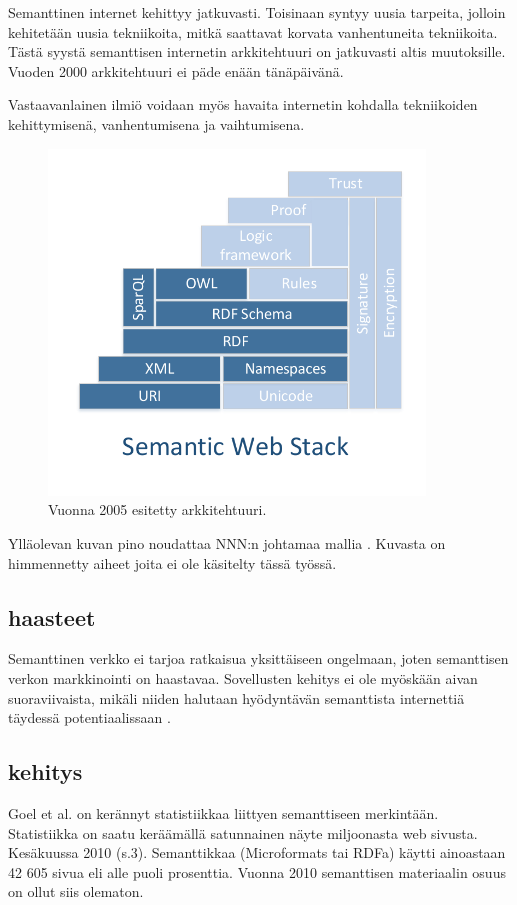 \documentclass[finnish, 12pt, a4paper, elec, utf8, pdfa, online]{aaltothesis}
\begin{document}
Semanttinen internet kehittyy jatkuvasti. Toisinaan syntyy uusia tarpeita, jolloin kehitetään uusia tekniikoita, mitkä saattavat korvata vanhentuneita tekniikoita. Tästä syystä semanttisen internetin arkkitehtuuri on jatkuvasti altis muutoksille. Vuoden 2000 arkkitehtuuri ei päde enään tänäpäivänä.

Vastaavanlainen ilmiö voidaan myös havaita internetin kohdalla tekniikoiden kehittymisenä, vanhentumisena ja vaihtumisena.

\begin{figure}[htb]
\centering
\includegraphics[width=10cm]{images/sweb-stack2.pdf}
\caption{Vuonna 2005 esitetty arkkitehtuuri. \label{images/sweb-stack2.pdf}}
\end{figure}


Ylläolevan kuvan pino noudattaa NNN:n johtamaa mallia \cite{stack}. Kuvasta on himmennetty aiheet joita ei ole käsitelty tässä työssä.
\clearpage %

\subsection{haasteet}
Semanttinen verkko ei tarjoa ratkaisua yksittäiseen ongelmaan, joten semanttisen verkon markkinointi on haastavaa. Sovellusten kehitys ei ole myöskään aivan suoraviivaista, mikäli niiden halutaan hyödyntävän semanttista internettiä täydessä potentiaalissaan \cite{lassila_dissertion}.

\subsection{kehitys}
Goel et al. on kerännyt statistiikkaa liittyen semanttiseen merkintään. Statistiikka on saatu keräämällä satunnainen näyte miljoonasta web sivusta. Kesäkuussa 2010 \cite{Google} (s.3). Semanttikkaa (Microformats tai RDFa) käytti ainoastaan 42 605 sivua eli alle puoli prosenttia. Vuonna 2010 semanttisen materiaalin osuus on ollut siis olematon.
\end{document}
